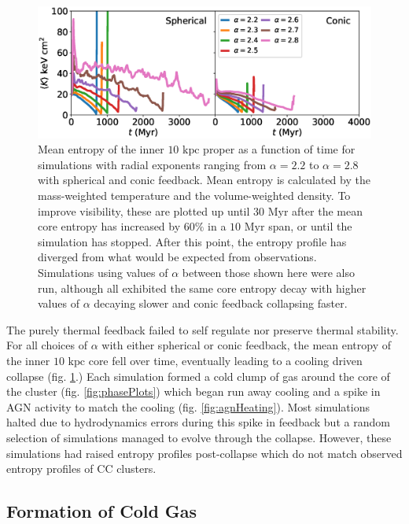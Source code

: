 \documentclass[iop,apjl, twocolappendix]{emulateapj}   %
\begin{document}
\begin{figure}
  \begin{center}
    \includegraphics[width=1\linewidth]{figures/avgCoreEntropies.eps}
  \end{center}
  \caption{
    \label{fig:avgCoreEntropies}
    Mean entropy of the inner $10 \text{ kpc}$ proper as a function of time for
    simulations with radial exponents ranging from $\alpha=2.2$ to $\alpha=2.8$
    with spherical and conic feedback.  Mean entropy is calculated by the
    mass-weighted temperature and the volume-weighted density. To improve
    visibility, these are plotted up until $30 \text{ Myr}$ after the mean core
    entropy has increased by $60\%$ in a $10 \text{ Myr}$ span, or until the
    simulation has stopped. After this point, the entropy profile has diverged
    from what would be expected from observations. Simulations using values of
    $\alpha$ between those shown here were also run, although all exhibited the
    same core entropy decay with higher values of $\alpha$ decaying slower and
    conic feedback collapsing faster.
  }
\end{figure}

The purely thermal feedback failed to self regulate nor preserve thermal
stability. For all choices of $\alpha$ with either spherical or conic feedback,
the mean entropy of the inner $10 \text{ kpc}$ core fell over time, eventually
leading to a cooling driven collapse (fig. \ref{fig:avgCoreEntropies}.) Each
simulation formed a cold clump of gas around the core of the cluster (fig.
\ref{fig:phasePlots}) which began run away cooling and a spike in AGN activity
to match the cooling (fig. \ref{fig:agnHeating}). Most simulations halted due
to hydrodynamics errors during this spike in feedback but a random selection of
simulations managed to evolve through the collapse. However, these simulations
had raised entropy profiles post-collapse which do not match observed entropy
profiles of CC clusters.

\subsection{Formation of Cold Gas}
\label{sec:formation_of_cold_gas}
\end{document}
